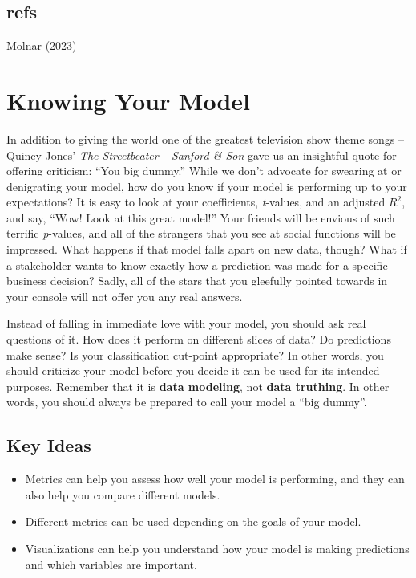 \documentclass[
  letterpaper,
]{krantz}
\providecommand{\tightlist}{%
  \setlength{\itemsep}{0pt}\setlength{\parskip}{0pt}}\usepackage{longtable,booktabs,array}
\begin{document}
\section{refs}\label{refs}

Molnar (2023)

\chapter{Knowing Your Model}\label{sec-knowing}

In addition to giving the world one of the greatest television show
theme songs -- Quincy Jones' \emph{The Streetbeater} -- \emph{Sanford \&
Son} gave us an insightful quote for offering criticism: ``You big
dummy.'' While we don't advocate for swearing at or denigrating your
model, how do you know if your model is performing up to your
expectations? It is easy to look at your coefficients, \emph{t}-values,
and an adjusted \(R^2\), and say, ``Wow! Look at this great model!''
Your friends will be envious of such terrific \emph{p}-values, and all
of the strangers that you see at social functions will be impressed.
What happens if that model falls apart on new data, though? What if a
stakeholder wants to know exactly how a prediction was made for a
specific business decision? Sadly, all of the stars that you gleefully
pointed towards in your console will not offer you any real answers.

Instead of falling in immediate love with your model, you should ask
real questions of it. How does it perform on different slices of data?
Do predictions make sense? Is your classification cut-point appropriate?
In other words, you should criticize your model before you decide it can
be used for its intended purposes. Remember that it is \textbf{data
modeling}, not \textbf{data truthing}. In other words, you should always
be prepared to call your model a ``big dummy''.

\section{Key Ideas}\label{sec-knowing-key}

\begin{itemize}
\tightlist
\item
  Metrics can help you assess how well your model is performing, and
  they can also help you compare different models.
\item
  Different metrics can be used depending on the goals of your model.
\item
  Visualizations can help you understand how your model is making
  predictions and which variables are important.
\end{itemize}
\end{document}
